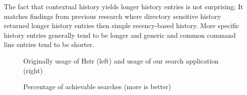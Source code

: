 

The fact that contextual history yields longer history entries is not surprising; It matches findings from previous research\cite{greenberg1993computer} where directory sensitive history returned longer history entries then simple recency-based history. More specific history entries generally tend to be longer and generic and common command line entries tend to be shorter. 


\begin{figure}
\centering
{}\hfill
{}
\caption{Percentage of achievable searches (more is better)}
\small{Originally usage of Hstr (left) and usage of our search application (right)}
\label{eval-metrics-plot-dist-0-cmds}
\end{figure}


